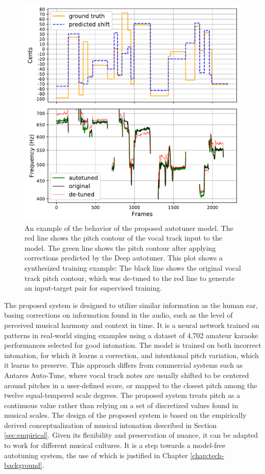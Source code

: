\begin{figure}[t]
    \centering
    \includegraphics[width=\columnwidth]{figures/results.pdf}
    \caption{An example of the behavior of the proposed autotuner model. The red line shows the pitch contour of the vocal track input to the model. The green line shows the pitch contour after applying corrections predicted by the Deep autotuner. This plot shows a synthesized training example: The black line shows the original vocal track pitch contour, which was de-tuned to the red line to generate an input-target pair for supervised training.}
    \label{fig:results}
\end{figure}

The proposed system is designed to utilize similar information as the human ear, basing corrections on information found in the audio, such as the level of perceived musical harmony and context in time. It is a neural network trained on patterns in real-world singing examples using a dataset of 4,702 amateur karaoke performances selected for good intonation. The model is trained on both incorrect intonation, for which it learns a correction, and intentional pitch variation, which it learns to preserve. This approach differs from commercial systems such as Antares Auto-Tune, where vocal track notes are usually shifted to be centered around pitches in a user-defined score, or mapped to the closest pitch among the twelve equal-tempered scale degrees. The proposed system treats pitch as a continuous value rather than relying on a set of discretized values found in musical scales. The design of the proposed system is based on the empirically derived conceptualization of musical intonation described in Section \ref{sec:empirical}. Given its flexibility and preservation of nuance, it can be adapted to work for different musical cultures. It is a step towards a model-free autotuning system, the use of which is justified in Chapter \ref{chap:tech-background}. 


